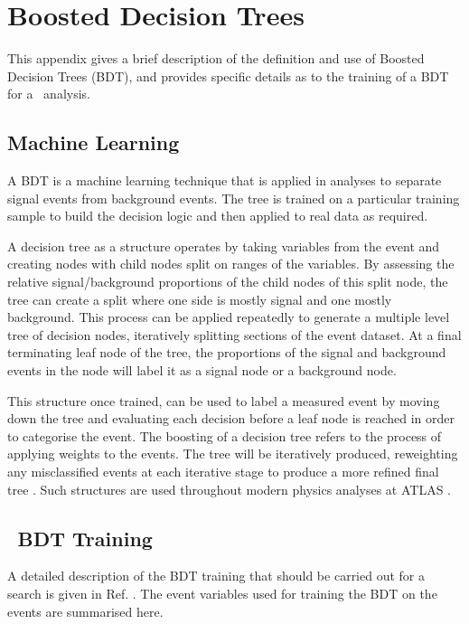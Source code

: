 \chapter{Boosted Decision Trees}\label{a:bdt}

This appendix gives a brief description of the definition and use of Boosted Decision Trees (BDT), and provides specific details as to the training of a BDT for a \VBFHBB\, analysis.

\section{Machine Learning}

A BDT is a machine learning technique that is applied in analyses to separate signal events from background events. The tree is trained on a particular training sample to build the decision logic and then applied to real data as required.

A decision tree as a structure operates by taking variables from the event and creating nodes with child nodes split on ranges of the variables. By assessing the relative signal/background proportions of the child nodes of this split node, the tree can create a split where one side is mostly signal and one mostly background. This process can be applied repeatedly to generate a multiple level tree of decision nodes, iteratively splitting sections of the event dataset. At a final terminating leaf node of the tree, the proportions of the signal and background events in the node will label it as a signal node or a background node.

This structure once trained, can be used to label a measured event by moving down the tree and evaluating each decision before a leaf node is reached in order to categorise the event. The boosting of a decision tree refers to the process of applying weights to the events. The tree will be iteratively produced, reweighting any misclassified events at each iterative stage to produce a more refined final tree \cite{bdt}. Such structures are used throughout modern physics analyses at ATLAS \cite{mlbtag}.

\section{\VBFHBB\, BDT Training}

A detailed description of the BDT training that should be carried out for a \VBFHBB\, search is given in Ref. \cite{VBFHbb8tev}. The event variables used for training the BDT on the \VBFHBB\, events are summarised here.

